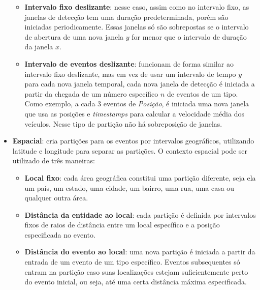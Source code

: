 \begin{itemize}
\begin{itemize}
\item \textbf{Intervalo fixo deslizante}: 
nesse caso, assim como no intervalo fixo, as janelas de detecção tem uma duração predeterminada, porém são iniciadas periodicamente. Essas janelas só são sobrepostas se o intervalo de abertura de uma nova janela $y$ for menor que o intervalo de duração da janela $x$.
\item \textbf{Intervalo de eventos deslizante}: funcionam de forma similar ao intervalo fixo deslizante, mas em vez de usar um intervalo de tempo $y$ para cada nova janela temporal, cada nova janela de detecção é iniciada a partir da chegada de um número específico $n$ de eventos de um tipo. Como exemplo, a cada 3 eventos de \emph{Posição}, é iniciada uma nova janela que usa as posições e \textit{timestamps} para calcular a velocidade média dos veículos. Nesse tipo de partição não há sobreposição de janelas. %
\end{itemize}
\item \textbf{Espacial}: cria partições para os eventos por intervalos geográficos, utilizando latitude e longitude para separar as partições. O contexto espacial pode ser utilizado de três maneiras:
\begin{itemize}
\item \textbf{Local fixo}: cada área geográfica constitui uma partição diferente, seja ela um país, um estado, uma cidade, um bairro, uma rua, uma casa ou qualquer outra área.
\item \textbf{Distância da entidade ao local}: cada partição é definida por intervalos fixos de raios de distância entre um local específico e a posição especificada no evento.
\item \textbf{Distância do evento ao local}: uma nova partição é iniciada a partir da entrada de um evento de um tipo específico. Eventos subsequentes só entram na partição caso suas localizações estejam suficientemente perto do evento inicial, ou seja, até uma certa distância máxima especificada.

\end{itemize}
\end{itemize}
